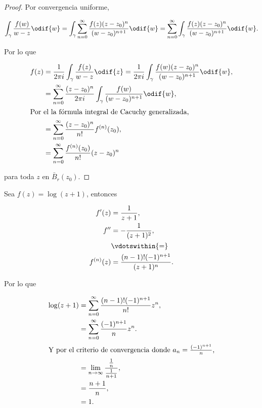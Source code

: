 \documentclass[../main.tex]{subfiles}
\begin{document}
\begin{proof}
    Por convergencia uniforme,

    \begin{equation*}
        \int_{\gamma}^{}\dfrac{f(w)}{w - z}\odif{w} = \int_{\gamma}^{}\sum_{n =
        0}^{\infty}\dfrac{f(z)(z - z_{0})^{n}}{(w - z_{0})^{n + 1}}\odif{w} = \sum_{n =
        0}^{\infty}\int_{\gamma}^{}\dfrac{f(z)(z - z_{0})^{n}}{(w - z_{0})^{n
        + 1}}\odif{w}.
    \end{equation*}

    Por lo que

    \begin{align*}
        f(z) &= \dfrac{1}{2\pi i}\int_{\gamma}^{}\dfrac{f(z)}{w - z}\odif{z}
        = \dfrac{1}{2\pi
        i}\int_{\gamma}^{}\dfrac{f(w)(z - z_{0})^{n}}{(w - z_{0})^{n + 1}}\odif{w},\\
        &= \sum_{n = 0}^{\infty}\dfrac{(z - z_{0})^{n}}{2\pi
        i}\int_{\gamma}^{}\dfrac{f(w)}{(w
        - z_{0})^{n + 1}}\odif{w},\\
        \intertext{Por el la fórmula integral de Cacuchy generalizada,}
        &= \sum_{n = 0}^{\infty}\dfrac{(z - z_{0})^{n}}{n!}f^{(n)}(z_{0}),\\
        &=\sum_{n = 0}^{\infty} \dfrac{f^{(n)}(z_{0})}{n!}(z - z_{0})^{n}
    \end{align*}

    para toda \(z\) en \(\bar{B}_{r}(z_{0})\).
\end{proof}

\begin{example}
    Sea \(f(z) = \log(z + 1)\), entonces

    \begin{align*}
        f^{\prime}(z) &= \dfrac{1}{z + 1},\\
        f^{\prime\prime} &= - \dfrac{1}{(z + 1)^{2}},\\
        &\vdotswithin{ = }\\
        f^{(n)}(z) &= \dfrac{(n - 1)!(-1)^{n + 1}}{(z + 1)^{n}}.
    \end{align*}

    Por lo que

    \begin{align*}
        \log(z + 1) &= \sum_{n = 0}^{\infty}\dfrac{(n - 1)!(-1)^{n + 1}}{n!}z^{n},\\
        &= \sum_{n = 0}^{\infty}\dfrac{(-1)^{n + 1}}{n}z^{n}.\\
        \intertext{Y por el criterio de convergencia donde \(a_{n} = \tfrac{(-1)^{n +
        1}}{n}\),}
        &= \lim_{n \to \infty} \dfrac{\tfrac{1}{n}}{\tfrac{1}{n + 1}},\\
        &= \dfrac{n + 1}{n},\\
        &= 1.
    \end{align*}
\end{example}
\end{document}

